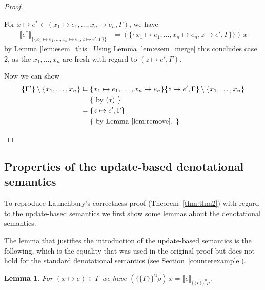 \documentclass[twopage]{scrartcl}
\newtheorem{lemma}{Lemma}
\theoremstyle{nonumberbreak}
\newtheorem{proof}{Proof}
\newcommand{\xen}{x_1\mapsto e_1, \ldots, x_n\mapsto e_n}
\newcommand{\dsem}[2]{\llbracket #1 \rrbracket_{#2}}
\newcommand{\esem}[1]{\{\!\!\!\{#1\}\!\!\!\}}
\newcommand{\esemu}[1]{\{\!\!\!\{#1\}\!\!\!\}^{\text{u}}}
\newcommand{\aexpl}[1]{&\mathrel{\phantom{=}}\left\{\text{ #1 }\right\}}
\begin{document}
\begin{proof}
\begin{compactitem}[$\sqsubseteq$:]
\begin{compactenum}
\item For $x \mapsto e^* \in (\xen, \Gamma)$, we have
\begin{align*}
\dsem{e^*}{\esem{\xen, z \mapsto e', \Gamma}}
&= (\esem{\xen, z \mapsto e', \Gamma})\, x
\end{align*}
by Lemma \ref{lem:esem_this}. Using Lemma \ref{lem:esem_merge} this concludes case 2, as the $x_1,\ldots,x_n$ are fresh with regard to $(z\mapsto e', \Gamma)$.
\end{compactenum}

Now we can show
\begin{align*}
\esem{\Gamma'} \setminus \{x_1,\ldots,x_n\}
&\sqsubseteq  \esem{\xen}{\esem{z \mapsto e', \Gamma}}  \setminus \{x_1,\ldots,x_n\} \\
\aexpl{by ($\ast$)} \\
& = {\esem{z \mapsto e', \Gamma}} \\
\aexpl{by Lemma \ref{lem:remove}.}
\end{align*}
\end{compactitem}

\end{proof}

\subsection{Properties of the update-based denotational semantics}
\label{updsemanticsprops}

To reproduce Launchbury's correctness proof (Theorem~\ref{thm:thm2}) with regard to the update-based semantics we first show some lemmas about the denotational semantics.
 

The lemma that justifies the introduction of the update-based semantics is the following, which is the equality that was used in the original proof but does not hold for the standard denotational semantics (see Section~\ref{counterexample}).

\begin{lemma}
\label{lem:esemu_this}
For $(x\mapsto e)\in \Gamma$ we have $(\esemu{\Gamma}\rho)\,x = \dsem{e}{\esemu{\Gamma}\rho}$.
\end{lemma}
\end{document}
